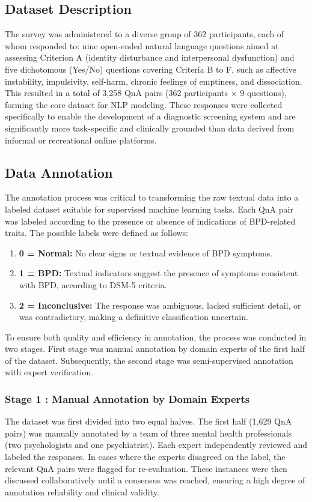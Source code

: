 \subsection{Dataset Description}
The survey was administered to a diverse group of 362 participants, each of whom responded to:
nine open-ended natural language questions aimed at assessing Criterion A (identity disturbance and interpersonal dysfunction) and five dichotomous (Yes/No) questions covering Criteria B to F, such as affective instability, impulsivity, self-harm, chronic feelings of emptiness, and dissociation. 
This resulted in a total of 3,258 QnA pairs (362 participants × 9 questions), forming the core dataset for NLP modeling. These responses were collected specifically to enable the development of a diagnostic screening system and are significantly more task-specific and clinically grounded than data derived from informal or recreational online platforms. 

\subsection{Data Annotation}
The annotation process was critical to transforming the raw textual data into a labeled dataset suitable for supervised machine learning tasks. Each QnA pair was labeled according to the presence or absence of indications of BPD-related traits. The possible labels were defined as follows:
\begin{enumerate}
    \item \textbf{0 = Normal:} No clear signs or textual evidence of BPD symptoms.
    \item \textbf{1 = BPD:} Textual indicators suggest the presence of symptoms consistent with BPD, according to DSM-5 criteria.
    \item \textbf{2 = Inconclusive:} The response was ambiguous, lacked sufficient detail, or was contradictory, making a definitive classification uncertain.
\end{enumerate}

To ensure both quality and efficiency in annotation, the process was conducted in two stages. First stage was manual annotation by domain experts of the first half of the dataset. Subsequently, the second stage was semi-supervised annotation with expert verification.

\subsubsection{Stage 1 : Manual Annotation by Domain Experts}
The dataset was first divided into two equal halves. The first half (1,629 QnA pairs) was manually annotated by a team of three mental health professionals (two psychologists and one psychiatrist). Each expert independently reviewed and labeled the responses. In cases where the experts disagreed on the label, the relevant QnA pairs were flagged for re-evaluation. These instances were then discussed collaboratively until a consensus was reached, ensuring a high degree of annotation reliability and clinical validity.


